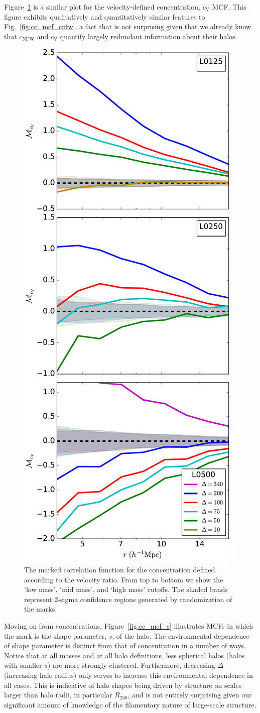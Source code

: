 \documentclass[usenatbib,usegraphicx,letterpaper]{mn2e}
\begin{document}
Figure~\ref{fig:cc_mcf_cV} is a similar plot for the velocity-defined concentration, $c_{\mathrm{V}}$ MCF. 
This figure exhibits qualitatively and quantitatively similar features to Fig.~\ref{fig:cc_mcf_cnfw}, a 
fact that is not surprising given that we already know that $c_{\mathrm{NFW}}$ and $c_{\mathrm{V}}$ 
quantify largely redundant information about their halos. 

\begin{figure}
	\centering
	\includegraphics[width=.4\textwidth]{all_mcf_cV.pdf}
	\caption{The marked correlation function for the concentration defined according to the velocity ratio. From top to bottom we show the `low mass', `mid mass', and `high mass' cutoffs. The shaded bands represent 2-sigma confidence regions generated by randomization of the marks.
}
	\label{fig:cc_mcf_cV}
\end{figure}

Moving on from concentrations, Figure~\ref{fig:cc_mcf_s} illustrates MCFs in which the mark is the shape parameter, $s$, of 
the halo. The environmental dependence of shape parameter is distinct from that of concentration in a number of ways. 
Notice that at all masses and at all halo definitions, less spherical halos (halos with smaller $s$) are more strongly 
clustered. Furthermore, decreasing $\Delta$ (increasing halo radius) only serves to increase this environmental 
dependence in all cases. This is indicative of halo shapes being driven by structure on scales larger than halo 
radii, in particular $R_{200}$, and is not entirely surprising given our significant amount of knowledge of the 
filamentary nature of large-scale structure. 
\end{document}
